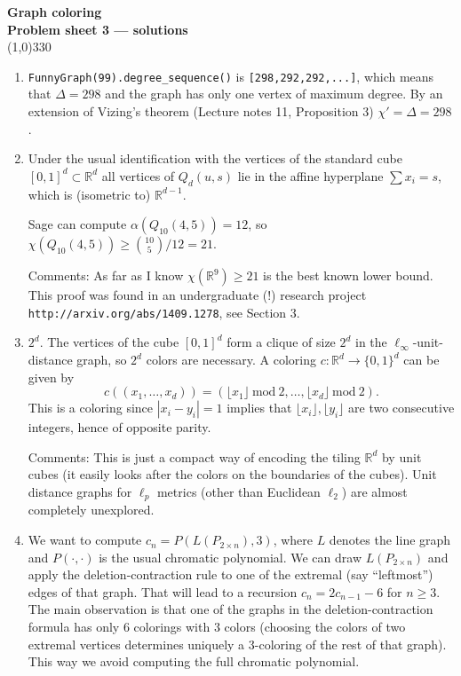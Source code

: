 \documentclass[a4paper]{article}
\newcommand{\RR}{\mathbb{R}}
\begin{document}
\pagestyle{empty}
\begin{center}
	{\Large\bf Graph coloring}\\
	{\large\bf Problem sheet 3 --- solutions}\\
	\line(1,0){330}
\end{center}


\begin{enumerate}
\item \texttt{FunnyGraph(99).degree\_sequence()} is \texttt{[298,292,292,...]}, which means that $\Delta=298$ and the graph has only one vertex of maximum degree. By an extension of Vizing's theorem (Lecture notes 11, Proposition 3) $\chi'=\Delta=298$. 

\item Under the usual identification with the vertices of the standard cube $[0,1]^d\subset \RR^d$ all vertices of $Q_d(u,s)$ lie in the affine hyperplane $\sum x_i =s$, which is (isometric to) $\RR^{d-1}$. 

Sage can compute $\alpha(Q_{10}(4,5))=12$, so $\chi(Q_{10}(4,5))\geq {10 \choose 5}/12 = 21$. 

\smallskip
Comments: As far as I know $\chi(\RR^9)\geq 21$ is the best known lower bound. This proof was found in an undergraduate (!) research project \texttt{http://arxiv.org/abs/1409.1278}, see Section 3. 

\item $2^d$. The vertices of the cube $[0,1]^d$ form a clique of size $2^d$ in the $\ell_\infty$-unit-distance graph, so $2^d$ colors are necessary. A coloring $c:\RR^d\to\{0,1\}^d$ can be given by
$$c((x_1,\ldots,x_d))=(\lfloor x_1\rfloor \ \textrm{mod}\ 2,\ldots, \lfloor x_d\rfloor \ \textrm{mod}\ 2 ).$$
This is a coloring since $|x_i-y_i|=1$ implies that $\lfloor x_i\rfloor, \lfloor y_i\rfloor$ are two consecutive integers, hence of opposite parity. 

\smallskip
Comments: This is just a compact way of encoding the tiling $\RR^d$ by unit cubes (it easily looks after the colors on the boundaries of the cubes). Unit distance graphs for $\ell_p$ metrics (other than Euclidean $\ell_2$) are almost completely unexplored.


\item We want to compute $c_n=P(L(P_{2\times n}), 3)$, where $L$ denotes the line graph and $P(\cdot,\cdot)$ is the usual chromatic polynomial. We can draw $L(P_{2\times n})$  and apply the deletion-contraction rule to one of the extremal (say ``leftmost'') edges of that graph. That will lead to a recursion $c_n=2c_{n-1}-6$ for $n\geq 3$. The main observation is that one of the graphs in the deletion-contraction formula has only $6$ colorings with $3$ colors (choosing the colors of two extremal vertices determines uniquely a $3$-coloring of the rest of that graph). This way we avoid computing the full chromatic polynomial.


\end{enumerate}
\end{document}
